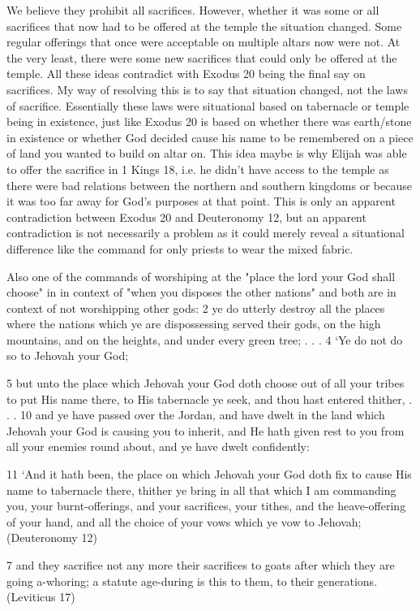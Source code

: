 \documentclass[11pt]{article}
\begin{document}
We believe they prohibit all sacrifices. However, whether it was some or all sacrifices that now had to be offered at the temple the situation changed. Some regular offerings that once were acceptable on multiple altars now were not. At the very least, there were some new sacrifices that could only be offered at the temple. All these ideas contradict with Exodus 20 being the final say on sacrifices. My way of resolving this is to say that situation changed, not the laws of sacrifice. Essentially these laws were situational based on tabernacle or temple being in existence, just like Exodus 20 is based on whether there was earth/stone in existence or whether God decided cause his name to be remembered on a piece of land you wanted to build on altar on. This idea maybe is why Elijah was able to offer the sacrifice in 1 Kings 18, i.e. he didn't have access to the temple as there were bad relations between the northern and southern kingdoms or because it was too far away for God's purposes at that point. This is only an apparent contradiction between Exodus 20 and Deuteronomy 12, but an apparent contradiction is not necessarily a problem as it could merely reveal a situational difference like the command for only priests to wear the mixed fabric.

Also one of the commands of worshiping at the "place the lord your God shall choose" in in context of "when you disposes the other nations" and both are in context of not worshipping other gods:
2 ye do utterly destroy all the places where the nations which ye are dispossessing served their gods, on the high mountains, and on the heights, and under every green tree; . . . 4 `Ye do not do so to Jehovah your God;

5 but unto the place which Jehovah your God doth choose out of all your tribes to put His name there, to His tabernacle ye seek, and thou hast entered thither,
. . . 
10 and ye have passed over the Jordan, and have dwelt in the land which Jehovah your God is causing you to inherit, and He hath given rest to you from all your enemies round about, and ye have dwelt confidently:

11 `And it hath been, the place on which Jehovah your God doth fix to cause His name to tabernacle there, thither ye bring in all that which I am commanding you, your burnt-offerings, and your sacrifices, your tithes, and the heave-offering of your hand, and all the choice of your vows which ye vow to Jehovah; (Deuteronomy 12)

7 and they sacrifice not any more their sacrifices to goats after which they are going a-whoring; a statute age-during is this to them, to their generations.
(Leviticus 17)
\end{document}

